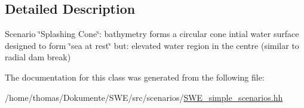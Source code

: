 \subsection{Detailed Description}
Scenario \char`\"{}\-Splashing Cone\char`\"{}\-: bathymetry forms a circular cone intial water surface designed to form \char`\"{}sea at rest\char`\"{} but\-: elevated water region in the centre (similar to radial dam break) 

The documentation for this class was generated from the following file\-:\begin{DoxyCompactItemize}
\item 
/home/thomas/\-Dokumente/\-S\-W\-E/src/scenarios/\hyperlink{SWE__simple__scenarios_8hh}{S\-W\-E\-\_\-simple\-\_\-scenarios.\-hh}\end{DoxyCompactItemize}
